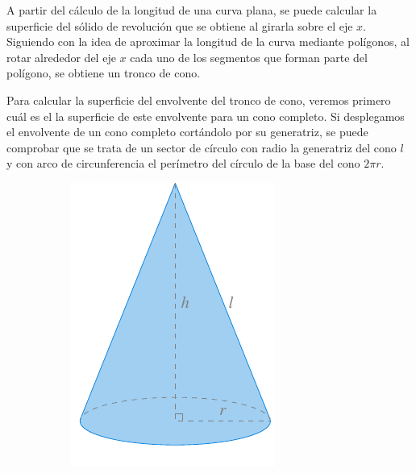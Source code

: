 \documentclass[
  a4paper,
]{scrreport}
\theoremstyle{definition}
\theoremstyle{plain}
\theoremstyle{definition}
\theoremstyle{definition}
\theoremstyle{plain}
\theoremstyle{plain}
\theoremstyle{remark}
\begin{document}
A partir del cálculo de la longitud de una curva plana, se puede
calcular la superficie del sólido de revolución que se obtiene al
girarla sobre el eje \(x\). Siguiendo con la idea de aproximar la
longitud de la curva mediante polígonos, al rotar alrededor del eje
\(x\) cada uno de los segmentos que forman parte del polígono, se
obtiene un tronco de cono.

Para calcular la superficie del envolvente del tronco de cono, veremos
primero cuál es el la superficie de este envolvente para un cono
completo. Si desplegamos el envolvente de un cono completo cortándolo
por su generatriz, se puede comprobar que se trata de un sector de
círculo con radio la generatriz del cono \(l\) y con arco de
circunferencia el perímetro del círculo de la base del cono \(2\pi r\).

\begin{figure}

\begin{minipage}{0.50\linewidth}

\begin{figure}[H]

{\centering \includegraphics{./img/integrales/cono.pdf}

}


\end{figure}%

\end{minipage}%
%
\begin{minipage}{0.50\linewidth}

\begin{figure}[H]


\end{figure}
\end{minipage}
\end{figure}
\end{document}
